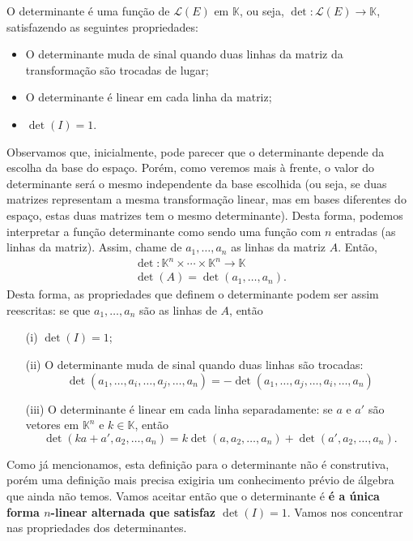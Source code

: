 \begin{defi} 
O determinante é uma função de ${\mathcal{L}}(E)$ em ${\mathbb{K}}$, ou seja, $\det:{\mathcal{L}}(E)\to {\mathbb{K}}$, satisfazendo as seguintes propriedades:
	\begin{itemize}
    	\item O determinante muda de sinal quando duas linhas da matriz da transformação são trocadas de lugar;
        \item O determinante é linear em cada linha da matriz;
        \item $\det(I)=1$.
    \end{itemize}
\end{defi}
Observamos que, inicialmente, pode parecer que o determinante depende da escolha da base do espaço. Porém, como veremos mais à frente, o valor do determinante será o mesmo independente da base escolhida (ou seja, se duas matrizes representam a mesma transformação linear, mas em bases diferentes do espaço, estas duas matrizes tem o mesmo determinante). Desta forma, podemos interpretar a função determinante como sendo uma função com $n$ entradas (as linhas da matriz). Assim, chame de $a_1,\ldots, a_n$ as linhas da matriz $A$. Então,
\begin{align*}
	\det : {\mathbb{K}}^n\times \cdots \times {\mathbb{K}}^n \to {\mathbb{K}}\\
    \det(A) = \det(a_1,\ldots,a_n).
\end{align*}
Desta forma, as propriedades que definem o determinante podem ser assim reescritas: se que $a_1,\ldots,a_n$ são as linhas de $A$, então
\begin{itemize}
\item[(i)] $\det(I) = 1$;
\item[(ii)] O determinante muda de sinal quando duas linhas são trocadas:
\begin{equation*}
\det(a_1,\ldots,a_i,\ldots,a_j,\ldots,a_n) = -\det(a_1,\ldots,a_j,\ldots,a_i,\ldots,a_n)
\end{equation*}
\item[(iii)] O determinante é linear em cada linha separadamente: se $a$ e $a'$ são vetores em ${\mathbb{K}}^n$ e $k\in {\mathbb{K}}$, então
\begin{equation*}
	\det(k a+a',a_2,\ldots,a_n) = k \det(a,a_2,\ldots,a_n)+\det(a',a_2,\ldots,a_n).
\end{equation*}
\end{itemize}

Como já mencionamos, esta definição para o determinante não é construtiva, porém uma definição mais precisa exigiria um conhecimento prévio de álgebra que ainda não temos. Vamos aceitar então que o determinante é {\bf{é a única forma $n$-linear alternada que satisfaz $\det(I)=1$}}. Vamos nos concentrar nas propriedades dos determinantes.

